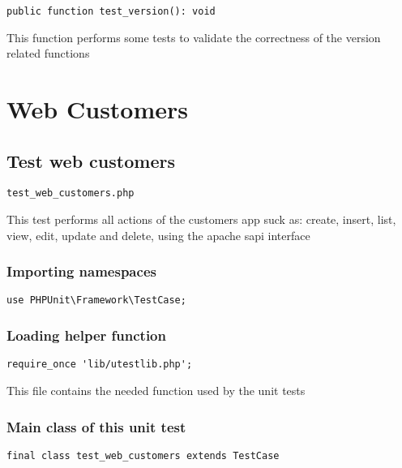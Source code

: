 \documentclass[a4paper]{article}
\begin{document}
\begin{lstlisting}
public function test_version(): void
\end{lstlisting}

This function performs some tests to validate the correctness
of the version related functions


\hypertarget{toc424}{}
\section{Web Customers}

\hypertarget{toc425}{}
\subsection{Test web customers}

\begin{lstlisting}
test_web_customers.php
\end{lstlisting}

This test performs all actions of the customers app suck as: create, insert,
list, view, edit, update and delete, using the apache sapi interface

\hypertarget{toc426}{}
\subsubsection{Importing namespaces}

\begin{lstlisting}
use PHPUnit\Framework\TestCase;
\end{lstlisting}

\hypertarget{toc427}{}
\subsubsection{Loading helper function}

\begin{lstlisting}
require_once 'lib/utestlib.php';
\end{lstlisting}

This file contains the needed function used by the unit tests

\hypertarget{toc428}{}
\subsubsection{Main class of this unit test}

\begin{lstlisting}
final class test_web_customers extends TestCase
\end{lstlisting}
\end{document}
